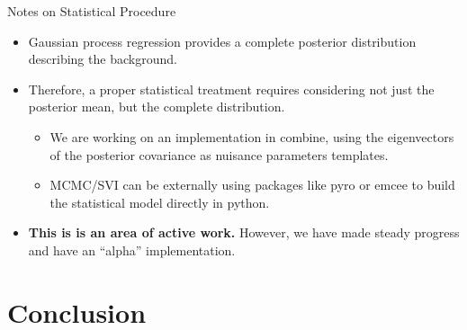 \documentclass[10pt]{beamer}
\begin{document}
\begin{frame}{Notes on Statistical Procedure}
  \begin{itemize}
  \item Gaussian process regression provides a complete posterior distribution describing the background. 
  \item Therefore, a proper statistical treatment requires considering not just the posterior mean, but the complete distribution.
    \begin{itemize}
    \item We are working on an implementation in combine, using the eigenvectors of the posterior covariance as nuisance parameters templates. 
    \item MCMC/SVI can be externally using packages like pyro or emcee to build the statistical model directly in python.
    \end{itemize}
  \item {\bfseries This is is an area of active work. } However, we have made steady progress and have an ``alpha'' implementation.
  \end{itemize}


\end{frame}

%   
%   


\section{Conclusion}
\label{sec:conclusion}
\end{document}
